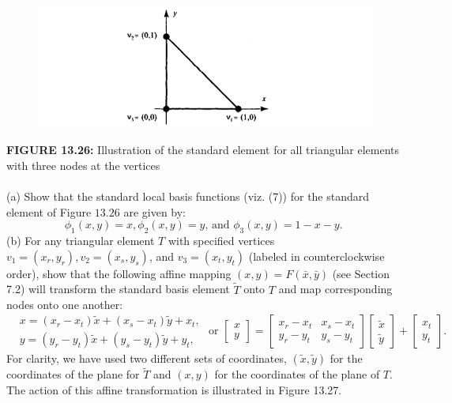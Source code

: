 \documentclass[../main.tex]{subfiles}
\begin{document}
\begin{enumerate}
	\begin{figure}[H]
\includegraphics[width=0.9\linewidth]{11}
	\centering
	\label{pfig:ch13_8}
\end{figure}
\textbf{FIGURE 13.26:} Illustration of the standard element for all triangular elements with three nodes 
at the vertices
\\
\\
(a) Show that the standard local basis functions (viz. (7)) for the standard element of Figure $13.26$ are given by:
$$
\phi_{1}(x, y)=x, \phi_{2}(x, y)=y \text {, and } \phi_{3}(x, y)=1-x-y \text {. }
$$
(b) For any triangular element $T$ with specified vertices $v_{1}=\left(x_{r}, y_{r}\right), v_{2}=\left(x_{s}, y_{s}\right)$, and $v_{3}=\left(x_{t}, y_{t}\right)$ (labeled in counterclockwise order), show that the following affine mapping $(x, y)=F(\bar{x}, \bar{y})$ (see Section 7.2) will transform the standard basis element $\tilde{T}$ onto $T$ and map corresponding nodes onto one another:
$$
\begin{aligned}
&x=\left(x_{r}-x_{t}\right) \tilde{x}+\left(x_{s}-x_{t}\right) \tilde{y}+x_{t}, \\
&y=\left(y_{r}-y_{t}\right) \tilde{x}+\left(y_{s}-y_{t}\right) \tilde{y}+y_{t},
\end{aligned} \text { or }\left[\begin{array}{l}
x \\
y
\end{array}\right]=\left[\begin{array}{ll}
x_{r}-x_{t} & x_{s}-x_{t} \\
y_{r}-y_{t} & y_{s}-y_{t}
\end{array}\right]\left[\begin{array}{l}
\tilde{x} \\
\tilde{y}
\end{array}\right]+\left[\begin{array}{l}
x_{t} \\
y_{t}
\end{array}\right] .
$$
For clarity, we have used two different sets of coordinates, $(\tilde{x}, \tilde{y})$ for the coordinates of the plane for $\tilde{T}$ and $(x, y)$ for the coordinates of the plane of $T$. The action of this affine transformation is illustrated in Figure 13.27.

\end{enumerate}
\end{document}
